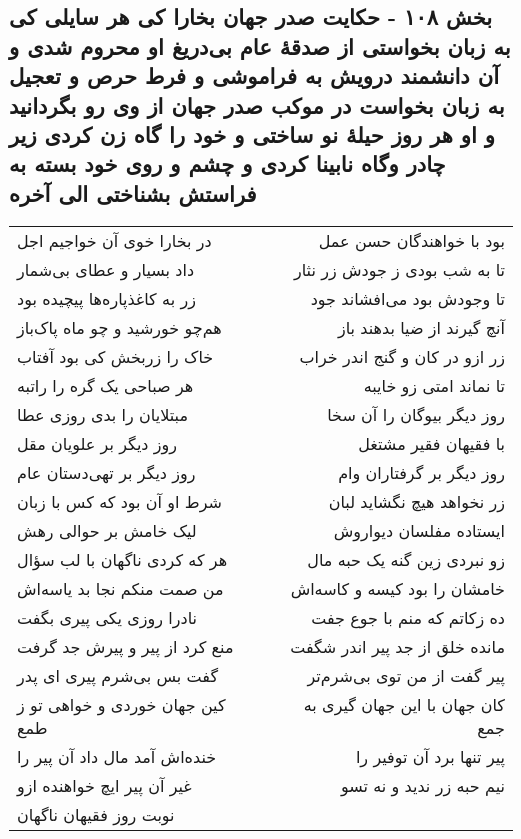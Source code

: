 \begin{center}
\section*{بخش ۱۰۸ - حکایت صدر جهان بخارا کی هر سایلی کی به زبان بخواستی از صدقهٔ عام بی‌دریغ او محروم شدی و آن دانشمند درویش به فراموشی و فرط حرص و تعجیل به زبان بخواست در موکب صدر جهان از وی رو بگردانید و او هر روز حیلهٔ نو ساختی و خود را گاه زن کردی زیر چادر وگاه نابینا کردی و چشم و  روی خود بسته به فراستش بشناختی  الی آخره}
\label{sec:sh108}
\begin{longtable}{l p{0.5cm} r}
در بخارا خوی آن خواجیم اجل
&&
بود با خواهندگان حسن عمل
\\
داد بسیار و عطای بی‌شمار
&&
تا به شب بودی ز جودش زر نثار
\\
زر به کاغذپاره‌ها پیچیده بود
&&
تا وجودش بود می‌افشاند جود
\\
هم‌چو خورشید و چو ماه پاک‌باز
&&
آنچ گیرند از ضیا بدهند باز
\\
خاک را زربخش کی بود آفتاب
&&
زر ازو در کان و گنج اندر خراب
\\
هر صباحی یک گره را راتبه
&&
تا نماند امتی زو خایبه
\\
مبتلایان را بدی روزی عطا
&&
روز دیگر بیوگان را آن سخا
\\
روز دیگر بر علویان مقل
&&
با فقیهان فقیر مشتغل
\\
روز دیگر بر تهی‌دستان عام
&&
روز دیگر بر گرفتاران وام
\\
شرط او آن بود که کس با زبان
&&
زر نخواهد هیچ نگشاید لبان
\\
لیک خامش بر حوالی رهش
&&
ایستاده مفلسان دیواروش
\\
هر که کردی ناگهان با لب سؤال
&&
زو نبردی زین گنه یک حبه مال
\\
من صمت منکم نجا بد یاسه‌اش
&&
خامشان را بود کیسه و کاسه‌اش
\\
نادرا روزی یکی پیری بگفت
&&
ده زکاتم که منم با جوع جفت
\\
منع کرد از پیر و پیرش جد گرفت
&&
مانده خلق از جد پیر اندر شگفت
\\
گفت بس بی‌شرم پیری ای پدر
&&
پیر گفت از من توی بی‌شرم‌تر
\\
کین جهان خوردی و خواهی تو ز طمع
&&
کان جهان با این جهان گیری به جمع
\\
خنده‌اش آمد مال داد آن پیر را
&&
پیر تنها برد آن توفیر را
\\
غیر آن پیر ایچ خواهنده ازو
&&
نیم حبه زر ندید و نه تسو
\\
نوبت روز فقیهان ناگهان

\end{longtable}
\end{center}
